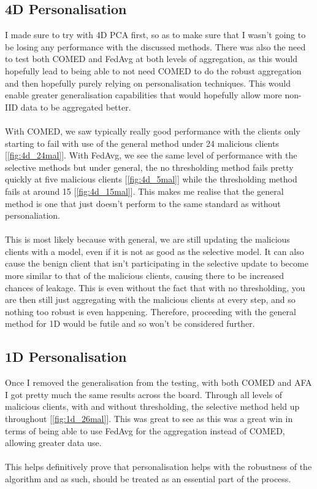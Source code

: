 \subsection{4D Personalisation}
I made sure to try with 4D PCA first, so as to make sure that I wasn't going to be losing any performance with the discussed methods.
There was also the need to test both COMED and FedAvg at both levels of aggregation, as this would hopefully lead to being able to not need COMED to do the robust aggregation and then hopefully purely relying on personalisation techniques.
This would enable greater generalisation capabilities that would hopefully allow more non-IID data to be aggregated better.
\\ \\ 
With COMED, we saw typically really good performance with the clients only starting to fail with use of the general method under 24 malicious clients [\ref{fig:4d_24mal}].
With FedAvg, we see the same level of performance with the selective methods but under general, the no thresholding method fails pretty quickly at five malicious clients [\ref{fig:4d_5mal}] while the thresholding method fails at around 15 [\ref{fig:4d_15mal}].
This makes me realise that the general method is one that just doesn't perform to the same standard as without personaliation.
\\ \\
This is most likely because with general, we are still updating the malicious clients with a model, even if it is not as good as the selective model.
It can also cause the benign client that isn't participating in the selective update to become more similar to that of the malicious clients, causing there to be increased chances of leakage.
This is even without the fact that with no thresholding, you are then still just aggregating with the malicious clients at every step, and so nothing too robust is even happening.
Therefore, proceeding with the general method for 1D would be futile and so won't be considered further.



\subsection{1D Personalisation}
Once I removed the generalisation from the testing, with both COMED and AFA I got pretty much the same results across the board.
Through all levels of malicious clients, with and without thresholding, the selective method held up throughout [\ref{fig:1d_26mal}].
This was great to see as this was a great win in terms of being able to use FedAvg for the aggregation instead of COMED, allowing greater data use.
\\ \\
This helps definitively prove that personalisation helps with the robustness of the algorithm and as such, should be treated as an essential part of the process.


